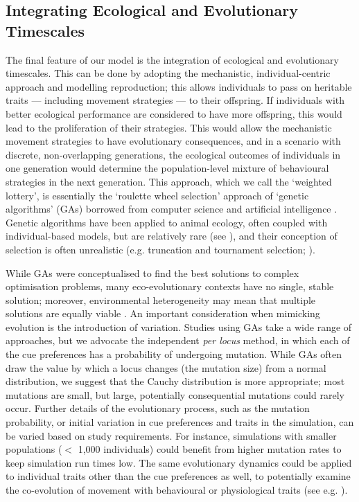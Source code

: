\subsection*{Integrating Ecological and Evolutionary Timescales}

The final feature of our model is the integration of ecological and evolutionary timescales.
This can be done by adopting the mechanistic, individual-centric approach and modelling reproduction; this allows individuals to pass on heritable traits --- including movement strategies --- to their offspring.
If individuals with better ecological performance are considered to have more offspring, this would lead to the proliferation of their strategies.
This would allow the mechanistic movement strategies to have evolutionary consequences, and in a scenario with discrete, non-overlapping generations, the ecological outcomes of individuals in one generation would determine the population-level mixture of behavioural strategies in the next generation.
This approach, which we call the `weighted lottery', is essentially the `roulette wheel selection' approach of `genetic algorithms' (GAs) borrowed from computer science and artificial intelligence \parencite[although GAs were themselves obviously inspired by biology][]{sumida1990,hamblin2013,correia2010,deangelis2019}.
Genetic algorithms have been applied to animal ecology, often coupled with individual-based models, but are relatively rare (see \cite{hamblin2013,beauchamp2007,hamblin2010,getz2015,getz2016}), and their conception of selection is often unrealistic (e.g. truncation and tournament selection; \cite{hamblin2013}).

While GAs were conceptualised to find the best solutions to complex optimisation problems, many eco-evolutionary contexts have no single, stable solution; moreover, environmental heterogeneity may mean that multiple solutions are equally viable \parencite{wolf2012}.
An important consideration when mimicking evolution is the introduction of variation.
Studies using GAs take a wide range of approaches, but we advocate the independent \textit{per locus} method, in which each of the cue preferences has a probability of undergoing mutation.
While GAs often draw the value by which a locus changes (the mutation size) from a normal distribution, we suggest that the Cauchy distribution is more appropriate; most mutations are small, but large, potentially consequential mutations could rarely occur.
Further details of the evolutionary process, such as the mutation probability, or initial variation in cue preferences and traits in the simulation, can be varied based on study requirements.
For instance, simulations with smaller populations ($<$ 1,000 individuals) could benefit from higher mutation rates to keep simulation run times low.
The same evolutionary dynamics could be applied to individual traits other than the cue preferences as well, to potentially examine the co-evolution of movement with behavioural or physiological traits (see e.g. \cite{gupte2021a}).

